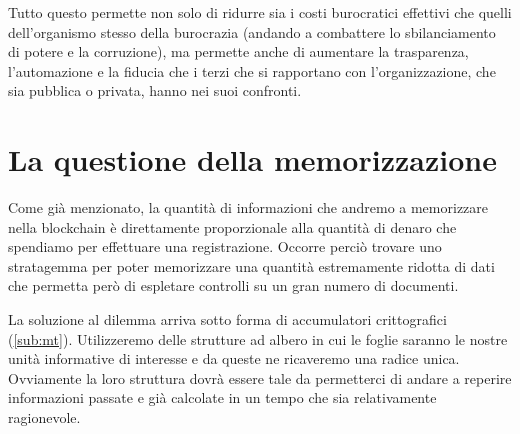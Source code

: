 Tutto questo permette non solo di ridurre sia i costi burocratici effettivi che quelli dell'organismo
stesso della burocrazia (andando a combattere lo sbilanciamento di potere e la corruzione),
ma permette anche di aumentare la trasparenza, l'automazione e la fiducia che i terzi che si
rapportano con l'organizzazione, che sia pubblica o privata, hanno nei suoi confronti.

\section{La questione della memorizzazione}

Come già menzionato, la quantità di informazioni che andremo a memorizzare
nella blockchain è direttamente proporzionale alla quantità di denaro che
spendiamo per effettuare una registrazione.
Occorre perciò trovare uno stratagemma per poter memorizzare una quantità
estremamente ridotta di dati che permetta però di espletare controlli su un gran numero
di documenti.

La soluzione al dilemma arriva sotto forma di accumulatori crittografici (\autoref{sub:mt}).
Utilizzeremo delle strutture ad albero in cui le foglie saranno le nostre unità
informative di interesse e da queste ne ricaveremo una radice unica.
Ovviamente la loro struttura dovrà essere tale da permetterci di andare a reperire
informazioni passate e già calcolate in un tempo che sia relativamente ragionevole.

\newpage